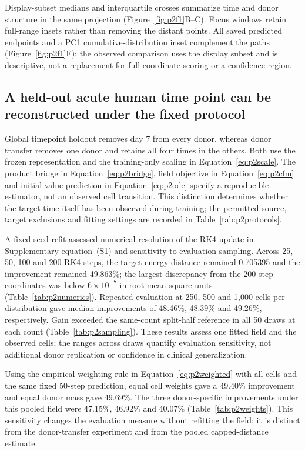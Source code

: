\documentclass[10pt,a4paper]{article}
\begin{document}
Display-subset medians and interquartile crosses summarize time and donor structure in the same projection (Figure~\ref{fig:p2f1}B--C). Focus windows retain full-range insets rather than removing the distant points. All saved predicted endpoints and a PC1 cumulative-distribution inset complement the paths (Figure~\ref{fig:p2f1}F); the observed comparison uses the display subset and is descriptive, not a replacement for full-coordinate scoring or a confidence region.

\subsection{A held-out acute human time point can be reconstructed under the fixed protocol}

Global timepoint holdout removes day 7 from every donor, whereas donor transfer removes one donor and retains all four times in the others. Both use the frozen representation and the training-only scaling in Equation~\eqref{eq:p2scale}. The product bridge in Equation~\eqref{eq:p2bridge}, field objective in Equation~\eqref{eq:p2cfm} and initial-value prediction in Equation~\eqref{eq:p2ode} specify a reproducible estimator, not an observed cell transition. This distinction determines whether the target time itself has been observed during training; the permitted source, target exclusions and fitting settings are recorded in Table~\ref{tab:p2protocols}.

A fixed-seed refit assessed numerical resolution of the RK4 update in Supplementary equation~(S1) and sensitivity to evaluation sampling. Across 25, 50, 100 and 200 RK4 steps, the target energy distance remained 0.705395 and the improvement remained 49.863\%; the largest discrepancy from the 200-step coordinates was below $6\times10^{-7}$ in root-mean-square units (Table~\ref{tab:p2numerics}). Repeated evaluation at 250, 500 and 1,000 cells per distribution gave median improvements of 48.46\%, 48.39\% and 49.26\%, respectively. Gain exceeded the same-count split-half reference in all 50 draws at each count (Table~\ref{tab:p2sampling}). These results assess one fitted field and the observed cells; the ranges across draws quantify evaluation sensitivity, not additional donor replication or confidence in clinical generalization.

Using the empirical weighting rule in Equation~\eqref{eq:p2weighted} with all cells and the same fixed 50-step prediction, equal cell weights gave a 49.40\% improvement and equal donor mass gave 49.69\%. The three donor-specific improvements under this pooled field were 47.15\%, 46.92\% and 40.07\% (Table~\ref{tab:p2weights}). This sensitivity changes the evaluation measure without refitting the field; it is distinct from the donor-transfer experiment and from the pooled capped-distance estimate.
\end{document}

